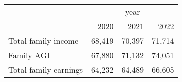 \documentclass{article}
\begin{document}
\begin{tabular}{llll}
\cline{1-4}
\multicolumn{1}{c}{} &
  \multicolumn{3}{|c}{year} \\
\multicolumn{1}{c}{} &
  \multicolumn{1}{|r}{2020} &
  \multicolumn{1}{r}{2021} &
  \multicolumn{1}{r}{2022} \\
\cline{1-4}
\multicolumn{1}{l}{Total family income} &
  \multicolumn{1}{|r}{68,419} &
  \multicolumn{1}{r}{70,397} &
  \multicolumn{1}{r}{71,714} \\
\multicolumn{1}{l}{Family AGI} &
  \multicolumn{1}{|r}{67,880} &
  \multicolumn{1}{r}{71,132} &
  \multicolumn{1}{r}{74,051} \\
\multicolumn{1}{l}{Total family earnings} &
  \multicolumn{1}{|r}{64,232} &
  \multicolumn{1}{r}{64,489} &
  \multicolumn{1}{r}{66,605} \\
\cline{1-4}
\end{tabular}
\end{document}
